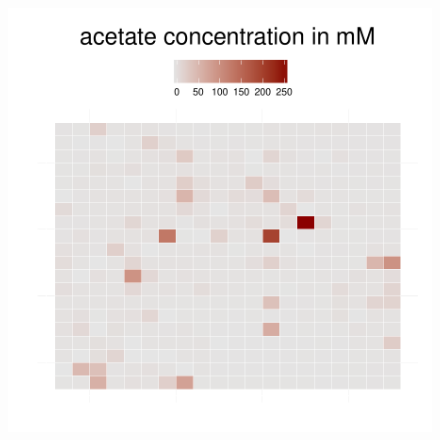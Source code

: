 \begin{figure}[h!]
{\begin{minipage}[t]{0.3\textwidth}
  \end{minipage}
  \begin{minipage}[t]{0.3\textwidth}
    \includegraphics[width=\textwidth]{../results/barkeri_ecoli_20x20_seed4612_ace130.pdf}
  \end{minipage}
  }
\end{figure}
